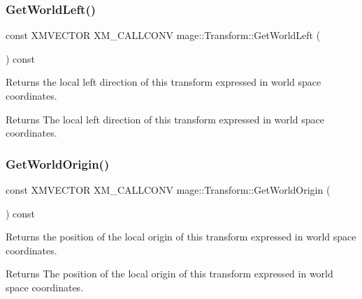 \subsubsection{\texorpdfstring{Get\+World\+Left()}{GetWorldLeft()}}
{\footnotesize\ttfamily const X\+M\+V\+E\+C\+T\+OR X\+M\+\_\+\+C\+A\+L\+L\+C\+O\+NV mage\+::\+Transform\+::\+Get\+World\+Left (\begin{DoxyParamCaption}{ }\end{DoxyParamCaption}) const\hspace{0.3cm}{\ttfamily [noexcept]}}

Returns the local left direction of this transform expressed in world space coordinates.

\begin{DoxyReturn}{Returns}
The local left direction of this transform expressed in world space coordinates. 
\end{DoxyReturn}
\hypertarget{classmage_1_1_transform_a1458cffad0cf017a2302200b2679a906}{}\label{classmage_1_1_transform_a1458cffad0cf017a2302200b2679a906} 
\subsubsection{\texorpdfstring{Get\+World\+Origin()}{GetWorldOrigin()}}
{\footnotesize\ttfamily const X\+M\+V\+E\+C\+T\+OR X\+M\+\_\+\+C\+A\+L\+L\+C\+O\+NV mage\+::\+Transform\+::\+Get\+World\+Origin (\begin{DoxyParamCaption}{ }\end{DoxyParamCaption}) const\hspace{0.3cm}{\ttfamily [noexcept]}}

Returns the position of the local origin of this transform expressed in world space coordinates.

\begin{DoxyReturn}{Returns}
The position of the local origin of this transform expressed in world space coordinates. 
\end{DoxyReturn}
\hypertarget{classmage_1_1_transform_af415c8f2b8d22e69df2878044b9414c5}{}\label{classmage_1_1_transform_af415c8f2b8d22e69df2878044b9414c5} 
